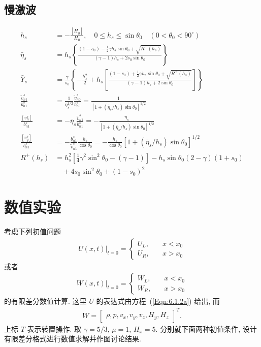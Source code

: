 \documentclass[10.5pt
]{article}
\begin{document}
\subsection{慢激波}
\begin{align}
h_s &= -\frac{[H_y]}{H_0}, \quad 0 \le h_s \le \sin\theta_0 \quad (0 < \theta_0 < 90^\circ)
\\
\bar{\eta}_s &= h_s \left\{\frac{(1-s_0) - \frac{1}{2} \gamma h_s \sin\theta_0 +
\sqrt{R^+ (h_s)}}{(\gamma-1) h_s + 2 s_0 \sin\theta_0}\right\}
\\
\bar{Y}_s &= \frac{\gamma}{s_0} \left\{-\frac{h_s^2}{2} + h_s \left[\frac{(1-s_0) +
\frac{1}{2} \gamma h_s \sin\theta_0 + \sqrt{R^+ (h_s)}}{(\gamma-1) h_s + 2
\sin\theta_0}\right]\right\}
\\
\frac{\tilde{v}_{n1}^s}{b_{n1}^s} &= \frac{1}{\eta_s^{1/2}}
\frac{\tilde{v}_{n0}^s}{b_{n0}^s} = \frac{1}{[1+(\bar{\eta}_s/h_s)\sin\theta_0]^{1/2}}
\\
\frac{[v_n^s]}{b_{n1}^s} &= - \bar{\eta}_s \frac{\tilde{v}_{n1}^s}{b_{n1}^s} =
-\frac{\bar{\eta}_s}{[1+(\bar{\eta}_s/h_s)\sin\theta_0]^{1/2}}
\\
\frac{[v_y^s]}{b_{n1}^s} &= - \frac{b_{n1}^s}{\tilde{v}_{n1}^s}
\frac{h_s}{\cos\theta_0} = -\frac{h_s}{\cos\theta_0}
[1+(\bar{\eta}_s/h_s)\sin\theta_0]^{1/2}
\\
R^+(h_s) &= h_s^2 [\frac{1}{4} \gamma^2 \sin^2\theta_0 - (\gamma-1)] - h_s \sin\theta_0
(2-\gamma)(1+s_0) \nonumber
\\
& \quad + 4s_0 \sin^2\theta_0 + (1-s_0)^2
\end{align}

\section{数值实验}

考虑下列初值问题
\begin{align}
U(x,t)|_{t=0} = \left\{ \begin{array}{ll}
U_L, & \quad x < x_0 \\
U_R, & \quad x > x_0
\end{array} \right.
\end{align}
或者
\begin{align}
W(x,t)|_{t=0} = \left\{ \begin{array}{ll}
W_L, & \quad x < x_0 \\
W_R, & \quad x > x_0
\end{array} \right.
\end{align}
的有限差分数值计算. 这里 $U$ 的表达式由方程~(\ref{Eqn:6.1.2a}) 给出, 而
\begin{align}
W = \left[ \begin{array}{ccccccc}
\rho,
p,
v_x,
v_y,
v_z,
H_y,
H_z
\end{array} \right]^T.
\end{align}
上标 $T$ 表示转置操作. 取 $\gamma=5/3$, $\mu=1$, $H_x=5$. 分别就下面两种初值条件,
设计有限差分格式进行数值求解并作图讨论结果.
\end{document}
